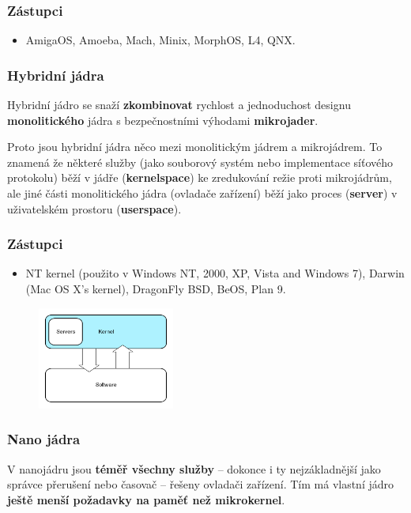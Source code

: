 \subsubsection*{Zástupci}
\begin{itemize}
\item AmigaOS, Amoeba, Mach, Minix, MorphOS, L4, QNX.
\end{itemize}

\subsubsection{Hybridní jádra}
Hybridní jádro se snaží \textbf{zkombinovat} rychlost a jednoduchost designu \textbf{monolitického} jádra s bezpečnostními výhodami \textbf{mikrojader}. 

Proto jsou hybridní jádra něco mezi monolitickým jádrem a mikrojádrem. To znamená že některé služby (jako souborový systém nebo implementace síťového protokolu) běží v jádře (\textbf{kernelspace}) ke zredukování režie proti mikrojádrům, ale jiné části monolitického jádra (ovladače zařízení) běží jako proces (\textbf{server}) v uživatelském prostoru (\textbf{userspace}).

\subsubsection*{Zástupci}
\begin{itemize}
\item NT kernel (použito v Windows NT, 2000, XP, Vista and Windows 7), Darwin (Mac OS X's kernel), DragonFly BSD, BeOS, Plan 9.
\end{itemize}
\begin{figure}[H]
	\centering
	\includegraphics[width=0.4\textwidth]{assets/3_hybridkernel}
\end{figure}

\subsubsection{Nano jádra}
V nanojádru jsou \textbf{téměř všechny služby} – dokonce i ty nejzákladnější jako správce přerušení nebo časovač – řešeny ovladači zařízení. Tím má vlastní jádro\textbf{ ještě menší požadavky na paměť než mikrokernel}.

